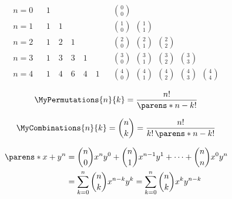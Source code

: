 \begin{multicols}{2}
\begin{CheatsheetEntryFrame}
        \begin{equation*}
            \begin{matrix}
                n = 0
                &&
                1
                &&
                \binom{0}{0}
                \\
                n = 1
                &&
                1 \quad 1
                &&
                \binom{1}{0}
                \:\: \binom{1}{1}
                \\
                n = 2
                &&
                1 \quad 2 \quad 1
                &&
                \binom{2}{0}
                \:\: \binom{2}{1}
                \:\: \binom{2}{2}
                \\
                n = 3
                &&
                1 \quad 3 \quad 3 \quad 1
                &&
                \binom{3}{0}
                \:\: \binom{3}{1}
                \:\: \binom{3}{2}
                \:\: \binom{3}{3}
                \\
                n = 4
                &&
                1 \quad 4 \quad 6 \quad 4 \quad 1
                &&
                \binom{4}{0}
                \:\: \binom{4}{1}
                \:\: \binom{4}{2}
                \:\: \binom{4}{3}
                \:\: \binom{4}{4}
            \end{matrix}
        \end{equation*}

        \begin{gather*}
            \MyPermutations{n}{k}
            = \frac{n!}{\parens*{n - k}!}
        \end{gather*}

        \begin{gather*}
            \MyCombinations{n}{k}
            = \binom{n}{k}
            = \frac{n!}{k! \, \parens*{n - k}!}
        \end{gather*}

    \end{CheatsheetEntryFrame}

    \begin{CheatsheetEntryFrame}

        \begin{align*}
            \parens*{x + y}^n
            &= \binom{n}{0} x^n y^0
            + \binom{n}{1} x^{n-1} y^1
            + \dots
            + \binom{n}{n} x^0 y^n
            \\
            &= \sum_{k=0}^n \binom{n}{k} x^{n-k} y^k
            = \sum_{k=0}^n \binom{n}{k} x^k y^{n-k}
        \end{align*}


\end{CheatsheetEntryFrame}
\end{multicols}
